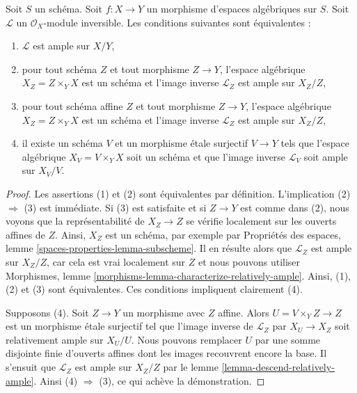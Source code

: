 \begin{lemma}
\label{lemma-relatively-ample-local}
Soit $S$ un schéma. Soit $f : X \to Y$ un morphisme d'espaces algébriques
sur $S$. Soit $\mathcal{L}$ un $\mathcal{O}_X$-module inversible.
Les conditions suivantes sont équivalentes :
\begin{enumerate}
\item $\mathcal{L}$ est ample sur $X/Y$,
\item pour tout schéma $Z$ et tout morphisme $Z \to Y$,
l'espace algébrique $X_Z = Z \times_Y X$ est un schéma
et l'image inverse $\mathcal{L}_Z$ est ample sur $X_Z/Z$,
\item pour tout schéma affine $Z$ et tout morphisme $Z \to Y$,
l'espace algébrique $X_Z = Z \times_Y X$ est un schéma
et l'image inverse $\mathcal{L}_Z$ est ample sur $X_Z/Z$,
\item il existe un schéma $V$ et un morphisme \'etale surjectif
$V \to Y$ tels que l'espace algébrique $X_V = V \times_Y X$ soit un schéma
et que l'image inverse $\mathcal{L}_V$ soit ample sur $X_V/V$.
\end{enumerate}
\end{lemma}

\begin{proof}
Les assertions (1) et (2) sont équivalentes par définition.
L'implication (2) $\Rightarrow$ (3) est immédiate.
Si (3) est satisfaite et si $Z \to Y$ est comme dans (2), nous voyons
que la représentabilité de $X_Z \to Z$ se vérifie localement sur les ouverts affines de $Z$.
Ainsi, $X_Z$ est un schéma, par exemple par
Propriétés des espaces, lemme \ref{spaces-properties-lemma-subscheme}.
Il en résulte alors que $\mathcal{L}_Z$ est ample sur $X_Z/Z$, car
cela est vrai localement sur $Z$ et nous pouvons utiliser
Morphismes, lemme \ref{morphisms-lemma-characterize-relatively-ample}.
Ainsi, (1), (2) et (3) sont équivalentes. Ces conditions
impliquent clairement (4).

\medskip\noindent
Supposons (4). Soit $Z \to Y$ un morphisme avec $Z$ affine.
Alors $U = V \times_Y Z \to Z$ est un morphisme \'etale surjectif
tel que l'image inverse de $\mathcal{L}_Z$ par $X_U \to X_Z$
soit relativement ample sur $X_U/U$.
Nous pouvons remplacer $U$ par une somme disjointe finie d'ouverts affines dont les images recouvrent encore la base.
Il s'ensuit que $\mathcal{L}_Z$ est ample sur $X_Z/Z$ par le
lemme \ref{lemma-descend-relatively-ample}.
Ainsi (4) $\Rightarrow$ (3), ce qui achève la démonstration.
\end{proof}

